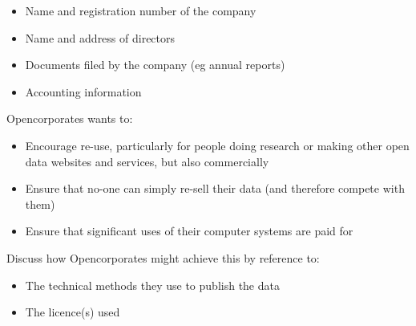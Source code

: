 \documentclass{article}
\begin{document}
\begin{itemize}
\item
  Name and registration number of the company
\item
  Name and address of directors
\item
  Documents filed by the company (eg annual reports)
\item
  Accounting information
\end{itemize}

Opencorporates wants to:

\begin{itemize}
\item
  Encourage re-use, particularly for people doing research or making
  other open data websites and services, but also commercially
\item
  Ensure that no-one can simply re-sell their data (and therefore
  compete with them)
\item
  Ensure that significant uses of their computer systems are paid for
\end{itemize}

Discuss how Opencorporates might achieve this by reference to:

\begin{itemize}
\item
  The technical methods they use to publish the data
\item
  The licence(s) used
\end{itemize}
\end{document}
